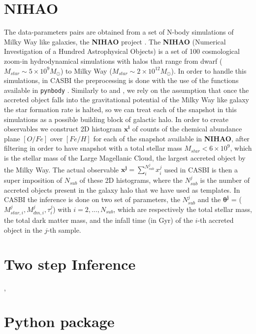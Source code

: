 \section{NIHAO}\label{sec:NIHAO}
The data-parameters pairs are obtained from a set of N-body simulations of Milky Way like galaxies, the \textbf{NIHAO} project \cite{wangNIHAOProjectReproducing2015}. The \textbf{NIHAO} (Numerical Investigation of a Hundred Astrophysical Objects) is a set of 100 cosmological zoom-in hydrodynamical simulations with halos that range from dwarf ($M_{star} \sim 5 \times 10^9 M_\odot$) to Milky Way ($M_{star} \sim 2 \times 10^12 M_\odot$). In order to handle this simulations, in CASBI the preprocessing is done with the use of the functions available in \texttt{pynbody} \cite{pontzenPynbodyNBodySPH2013}. Similarly to \cite{cunninghamReadingCARDsImprint2022} and \cite{deasonUnravellingMassSpectrum2023}, we rely on the assumption that once the accreted object falls into the gravitational potential of the Milky Way like galaxy the star formation rate is halted, so we can treat each of the snapshot in this simulations as a possible building block of galactic halo. In order to create observables we construct 2D histogram \textbf{$\mathbf{x^i}$} of counts of the chemical abundance plane $[O/Fe]$ over $[Fe/H]$ for each of the snapshot available in \textbf{NIHAO}, after filtering in order to have snapshot with a total stellar mass $M_{star} < 6 \times 10^9$, which is the stellar mass of the Large Magellanic Cloud, the largest accreted object by the Milky Way. The actual observable \textbf{$\mathbf{x^j} = \sum_i^{N_{sub}^j} x^j_i$ } used in CASBI is then a super imposition of $N_{sub}$ of these 2D histograms, where the $N_{sub}^j$ is the number of accreted objects present in the galaxy halo that we have used as templates. In CASBI the inference is done on two set of parameters, the $N_{sub}^j$ and the \textbf{$\mathbf{\theta^j}$} = ($M_{star, i}^j, M_{dm, i}^j, \tau_i^j $) with $i=2, ..., N_{sub}$, which are respectively the total stellar mass, the total dark matter mass, and the infall time (in Gyr) of the $i$-th accreted object in the $j$-th sample. 
  

\section{Two step Inference}\label{sec:Two step Inference},

\section{Python package}\label{sec:Python package}